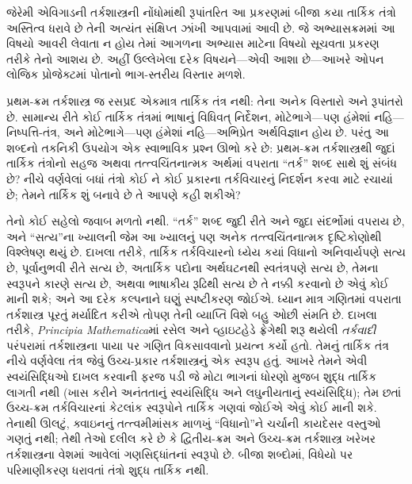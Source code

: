 \begin{editorial}
  જેરેમી એવિગાડની તર્કશાસ્ત્રની નોંધોમાંથી રૂપાંતરિત આ પ્રકરણમાં બીજા
  કયા તાર્કિક તંત્રો અસ્તિત્વ ધરાવે છે તેની અત્યંત સંક્ષિપ્ત ઝાંખી
  આપવામાં આવી છે. જે અભ્યાસક્રમમાં આ વિષયો આવરી લેવાતા ન હોય તેમાં
  આગળના અભ્યાસ માટેના વિષયો સૂચવતા પ્રકરણ તરીકે તેનો આશય છે. અહીં
  ઉલ્લેખેલા દરેક વિષયને---એવી આશા છે---આખરે ઓપન લોજિક પ્રોજેક્ટમાં
  પોતાનો ભાગ-સ્તરીય વિસ્તાર મળશે.
\end{editorial}

\begingroup
\makeatletter{}\makeatother


\label{guunit:OLP-0175}


પ્રથમ-ક્રમ તર્કશાસ્ત્ર જ રસપ્રદ એકમાત્ર તાર્કિક તંત્ર નથી: તેના અનેક
વિસ્તારો અને રૂપાંતરો છે. સામાન્ય રીતે કોઈ તાર્કિક તંત્રમાં ભાષાનું
વિધિવત્ નિર્દેશન, મોટેભાગે---પણ હંમેશાં નહિ---નિષ્પત્તિ-તંત્ર, અને
મોટેભાગે---પણ હંમેશાં નહિ---અભિપ્રેત અર્થવિજ્ઞાન હોય છે. પરંતુ આ
શબ્દનો તકનિકી ઉપયોગ એક સ્વાભાવિક પ્રશ્ન ઊભો કરે છે: પ્રથમ-ક્રમ
તર્કશાસ્ત્રથી જુદાં તાર્કિક તંત્રોનો સહજ અથવા તત્ત્વચિંતનાત્મક અર્થમાં
વપરાતા ``તર્ક'' શબ્દ સાથે શું સંબંધ છે? નીચે વર્ણવેલાં બધાં તંત્રો કોઈ
ને કોઈ પ્રકારના તર્કવિચારનું નિદર્શન કરવા માટે રચાયાં છે; તેમને
તાર્કિક શું બનાવે છે તે આપણે કહી શકીએ?

તેનો કોઈ સહેલો જવાબ મળતો નથી. ``તર્ક'' શબ્દ જુદી રીતે અને જુદા
સંદર્ભોમાં વપરાય છે, અને ``સત્ય''ના ખ્યાલની જેમ આ ખ્યાલનું પણ અનેક
તત્ત્વચિંતનાત્મક દૃષ્ટિકોણોથી વિશ્લેષણ થયું છે. દાખલા તરીકે, તાર્કિક
તર્કવિચારનો ધ્યેય કયાં વિધાનો અનિવાર્યપણે સત્ય છે, પૂર્વાનુભવી રીતે
સત્ય છે, અતાર્કિક પદોના અર્થઘટનથી સ્વતંત્રપણે સત્ય છે, તેમના સ્વરૂપને
કારણે સત્ય છે, અથવા ભાષાકીય રૂઢિથી સત્ય છે તે નક્કી કરવાનો છે એવું
કોઈ માની શકે; અને આ દરેક કલ્પનાને ઘણું સ્પષ્ટીકરણ જોઈએ. ધ્યાન માત્ર
ગણિતમાં વપરાતા તર્કશાસ્ત્ર પૂરતું મર્યાદિત કરીએ તોપણ તેની વ્યાપ્તિ
વિશે બહુ ઓછી સંમતિ છે. દાખલા તરીકે, \textit{Principia Mathematica}માં
રસેલ અને વ્હાઇટહેડે ફ્રેગેથી શરૂ થયેલી {\em તર્કવાદી} પરંપરામાં
તર્કશાસ્ત્રના પાયા પર ગણિત વિકસાવવાનો પ્રયત્ન કર્યો હતો. તેમનું
તાર્કિક તંત્ર નીચે વર્ણવેલા તંત્ર જેવું ઉચ્ચ-પ્રકાર તર્કશાસ્ત્રનું એક
સ્વરૂપ હતું. આખરે તેમને એવી સ્વયંસિદ્ધિઓ દાખલ કરવાની ફરજ પડી જે મોટા
ભાગનાં ધોરણો મુજબ શુદ્ધ તાર્કિક લાગતી નથી (ખાસ કરીને અનંતતાનું
સ્વયંસિદ્ધિ અને લઘુનીયતાનું સ્વયંસિદ્ધિ); તેમ છતાં ઉચ્ચ-ક્રમ તર્કવિચારનાં
કેટલાંક સ્વરૂપોને તાર્કિક ગણવાં જોઈએ એવું કોઈ માની શકે. તેનાથી ઊલટું,
ક્વાઇનનું તત્ત્વમીમાંસક માળખું ``વિધાનો''ને ચર્ચાની કાયદેસર વસ્તુઓ
ગણતું નથી; તેથી તેઓ દલીલ કરે છે કે દ્વિતીય-ક્રમ અને ઉચ્ચ-ક્રમ
તર્કશાસ્ત્ર ખરેખર તર્કશાસ્ત્રના વેશમાં આવેલાં ગણસિદ્ધાંતનાં સ્વરૂપો છે.
બીજા શબ્દોમાં, વિધેયો પર પરિમાણીકરણ ધરાવતાં તંત્રો શુદ્ધ તાર્કિક નથી.

